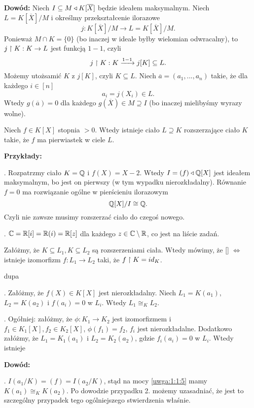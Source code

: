 \textbf{Dowód:} Niech $I\subseteq M\triangleleft K[\overline X]$ będzie ideałem maksymalnym. Niech $L=K[\overline X]/M$ i określmy przekształcenie ilorazowe
$$j:K[\overline X]/M\to L=K[\overline X]/M.$$
Ponieważ $M\cap K=\{0\}$ (bo inaczej w ideale byłby wielomian odwracalny), to $j\upharpoonright K:K\to L$ jest funkcją $1-1$, czyli
$$j\upharpoonright K:K\xrightarrow[]{1-1}j[K]\subseteq L.$$
Możemy utożsamić $K$ z $j[K]$, czyli $K\subseteq L$. Niech $\overline a=(a_1,..., a_n)$ takie, że dla każdego $i\in[n]$ 
$$a_i=j(X_i)\in L.$$
Wtedy $g(\overline a)=0$ dla każdego $g(\overline X)\in M\supseteq I$ (bo inaczej mielibyśmy wyrazy wolne).

\begin{wniosek}
    \label{wniosek1:2:4}
    Niech $f\in K[X]$ stopnia $>0$. Wtedy istnieje ciało $L\supseteq K$ rozszerzające ciało $K$ takie, że $f$ ma pierwiastek w ciele $L$.
\end{wniosek}

\textbf{Przykłady:}

. Rozpatrzmy ciało $K=\mathbb{Q}$ i $f(X)=X-2$. Wtedy $I=(f)\triangleleft\mathbb{Q}[X]$ jest ideałem maksymalnym, bo jest on pierwszy (w tym wypadku nierozkładalny). Równanie $f=0$ ma rozwiązanie ogólne w pierścieniu ilorazowym
$$\mathbb{Q}[X]/I\cong \mathbb{Q}.$$
Czyli nie zawsze musimy rozszerzać ciało do czegoś nowego.

. $\mathbb{C}=\mathbb{R}[i]=\mathbb{R}(i)=\mathbb{R}[z]$ dla każdego $z\in\mathbb{C}\setminus\mathbb{R}$, co jest na liście zadań.
\medskip

Załóżmy, że $K\subseteq L_1, K\subseteq L_2$ są rozszerzeniami ciała. Wtedy mówimy, że  [] $\iff$ istnieje izomorfizm $f:L_1\to L_2$ taki, że $f\upharpoonright K=id_K$.

\begin{fakt}{\color{back}dupa }
\label{fakt:1:2:5}

. Załóżmy, że $f(X)\in K[X]$ jest nierozkładalny. Niech $L_1=K(a_1)$, $L_2=K(a_2)$ i $f(a_i)=0$ w $L_i$. Wtedy $L_1\cong_KL_2$.

. Ogółniej: załóżmy, że $\phi:K_1\to K_2$ jest izomorfizmem i $f_1\in K_1[X],f_2\in K_2[X]$, $\phi(f_1)=f_2$, $f_i$ jest nierozkładalne. Dodatkowo załóżmy, że $L_1=K_1(a_1)$ i $L_2=K_2(a_2)$, gdzie $f_i(a_i)=0$ w $L_i$. Wtedy istnieje 
\end{fakt}

\textbf{Dowód:}

. $I(a_1/K)=(f)=I(a_2/K)$, stąd na mocy \ref{uwga:1:1:5} mamy $K(a_1)\cong_KK(a_2)$. Po dowodzie przypadku 2. możemy uzasadniać, że jest to szczególny przypadek tego ogólniejszego stwierdzenia właśnie.

